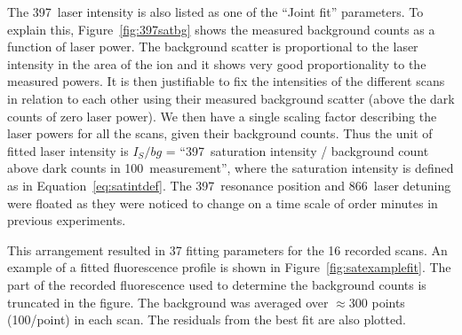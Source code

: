 The 397\nm\, laser intensity is also listed as one of the ``Joint fit'' parameters. To explain this, Figure~\ref{fig:397satbg} shows the measured background counts as a function of laser power. The background scatter is proportional to the laser intensity in the area of the ion and it shows very good proportionality to the measured powers. It is then justifiable to fix the intensities of the different scans in relation to each other using their measured background scatter (above the dark counts of zero laser power). We then have a single scaling factor describing the laser powers for all the scans, given their background counts. Thus the unit of fitted laser intensity is $I_S / bg$ = ``397\nm\, saturation intensity / background count above dark counts in 100\ms\, measurement'', where the saturation intensity is defined as in Equation~\ref{eq:satintdef}. The 397\nm\, resonance position and 866\nm\, laser detuning were floated as they were noticed to change on a time scale of order minutes in previous experiments.

This arrangement resulted in 37 fitting parameters for the 16 recorded scans. An example of a fitted fluorescence profile is shown in Figure~\ref{fig:satexamplefit}. The part of the recorded fluorescence used to determine the background counts is truncated in the figure. The background was averaged over $\approx$300 points (100\ms/point) in each scan. The residuals from the best fit are also plotted.

